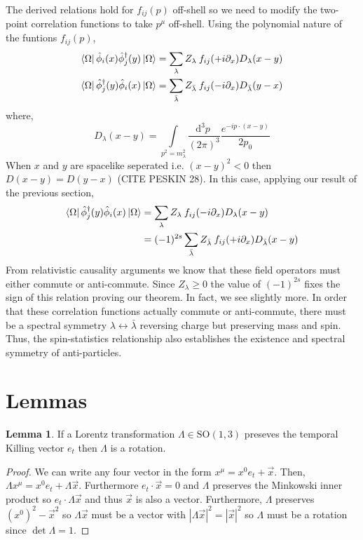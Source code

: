 \documentclass[12pt]{extarticle}
\newcommand{\dn}[2]{ \mathrm{d}^{#1} #2 \:}
\theoremstyle{definition}
\newtheorem{lemma}[theorem]{Lemma}
\newcommand{\SO}[1]{\mathrm{SO}\left(#1\right)}
\begin{document}
The derived relations hold for $f_{ij}(p)$ off-shell so we need to modify the two-point correlation functions to take $p^\mu$ off-shell. Using the polynomial nature of the funtions $f_{ij}(p)$,
\begin{subequations}
\begin{align}
\left< \Omega \right| \hat{\phi}_i(x) \hat{\phi}^\dagger_j(y) \left| \Omega \right> 
& = \sum_{\lambda} Z_\lambda \: f_{ij}(+ i \partial_x)  D_\lambda(x - y)
\\
\left< \Omega \right| \hat{\phi}^\dagger_j(y) \hat{\phi}_i(x) \left| \Omega \right> 
& = \sum_{\bar{\lambda}} Z_{\bar{\lambda}} \: f_{ij}(-i \partial_x)  D_{\bar{\lambda}}(y - x)
\end{align}
\end{subequations}
where,
\begin{equation}
D_\lambda(x - y) = \int\limits_{p^2 = m_\lambda^2} \frac{\dn{3}{p}}{(2 \pi)^3} \frac{e^{-i p \cdot (x - y)}}{2 p_0} 
\end{equation}
When $x$ and $y$ are spacelike seperated i.e. $(x - y)^2 < 0$ then $D(x - y) = D(y - x)$ (CITE PESKIN 28). In this case, applying our result of the previous section,
\begin{subequations}
\begin{align}
\left< \Omega \right| \hat{\phi}^\dagger_j(y) \hat{\phi}_i(x) \left| \Omega \right> 
& = \sum_{\lambda} Z_\lambda \: f_{ij}(- i \partial_x)  D_\lambda(x - y)
\\
& = (-1)^{2s} \sum_{\bar{\lambda}} Z_{\bar{\lambda}} \: f_{ij}(+i \partial_x)  D_{\bar{\lambda}}(x - y)
\end{align}
\end{subequations}
From relativistic causality arguments we know that these field operators must either commute or anti-commute. Since $Z_\lambda \ge 0$ the value of $(-1)^{2s}$ fixes the sign of this relation proving our theorem. In fact, we see slightly more. In order that these correlation functions actually commute or anti-commute, there must be a spectral symmetry $\lambda \leftrightarrow \bar{\lambda}$ reversing charge but preserving mass and spin. Thus, the spin-statistics relationship also establishes the existence and spectral symmetry of anti-particles.


\section{Lemmas}

\begin{lemma}
If a Lorentz transformation $\Lambda \in \SO{1,3}$ preseves the temporal Killing vector $e_t$ then $\Lambda$ is a rotation. 
\end{lemma}

\begin{proof}
We can write any four vector in the form $x^\mu = x^0 e_t + \vec{x}$. Then, $\Lambda x^\mu = x^0 e_t + \Lambda \vec{x}$. Furthermore $e_t \cdot \vec{x} = 0$ and $\Lambda$ preserves the Minkowski inner product so $e_t \cdot \Lambda \vec{x}$ and thus $\vec{x}$ is also a vector. Furthermore, $\Lambda$ preserves $(x^0)^2 - \vec{x}^2$ so $\Lambda \vec{x}$ must be a vector with $|\Lambda \vec{x}|^2 = |\vec{x}|^2$ so $\Lambda$ must be a rotation since $\det{\Lambda} = 1$. 
\end{proof}
\end{document}
